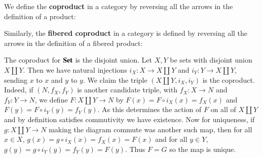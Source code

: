 \begin{definition}
    We define the \textbf{coproduct} in a category by reversing all the arrows in the definition of a product:
    \begin{center}
    \end{center}
    Similarly, the \textbf{fibered coproduct} in a category is defined by reversing all the arrows in the definition of a fibered product:
    \begin{center}
    \end{center}
\end{definition}

\begin{example}
    The coproduct for $\normalfont\textbf{Set}$ is the disjoint union. Let $X,Y$ be sets with disjoint union $X\amalg Y$. Then we have natural injections $i_X:X\rightarrow X\amalg Y$ and $i_Y:Y\rightarrow X\amalg Y$, sending $x$ to $x$ and $y$ to $y$. We claim the triple $(X\amalg Y,i_X,i_Y)$ is the coproduct. Indeed, if $(N,f_X,f_Y)$ is another candidate triple, with $f_X:X\rightarrow N$ and $f_Y:Y\rightarrow N$, we define $F:X\amalg Y\rightarrow N$ by $F(x) = F\circ i_X(x) = f_X(x)$ and $F(y) = F\circ i_Y(y) = f_Y(y)$. As this determines the action of $F$ on all of $X\amalg Y$ and by definition satisfies commutivity we have existence. Now for uniqueness, if $g:X\amalg Y\rightarrow N$ making the diagram commute was another such map, then for all $x \in X$, $g(x) = g\circ i_X(x) = f_X(x) = F(x)$ and for all $y \in Y$, $g(y) = g\circ i_Y(y) = f_Y(y) = F(y)$. Thus $F = G$ so the map is unique.
\end{example}

